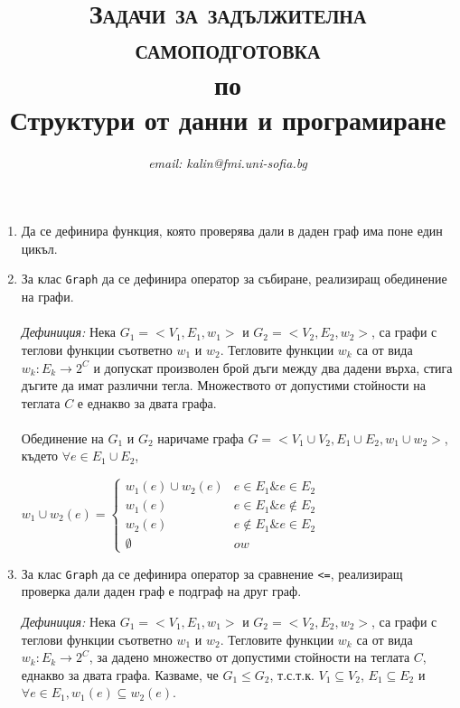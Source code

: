 \documentclass[12pt,a4paper]{article}
\author{\textit{email: kalin@fmi.uni-sofia.bg}}
\title{\textsc{Задачи за задължителна самоподготовка} \\
по \\
Структури от данни и програмиране}
\begin{document}
\maketitle


\begin{enumerate}

	\item Да се дефинира функция, която проверява дали в даден граф има поне един цикъл.

	\item За клас \texttt{Graph} да се дефинира оператор за събиране, реализиращ обединение на графи. 
	\\
	\\
	\textit{Дефиниция:} Нека $G_1=<V_1,E_1,w_1>$ и $G_2 = <V_2,E_2,w_2>$, са графи с теглови функции съответно $w_1$ и $w_2$. Тегловите функции $w_k$ са от вида $w_k:E_k \rightarrow 2^C$ и допускат произволен брой дъги между два дадени върха, стига дъгите да имат различни тегла. Множеството от допустими стойности на теглата $C$ е еднакво за двата графа. 
	\\
	\\
	Обединение на $G_1$ и $G_2$ наричаме графа $G=<V_1 \cup V_2,E_1 \cup E_2,w_1 \cup w_2>$, където $\forall e \in E_1 \cup E_2$, 

$w_1 \cup w_2 (e) = \begin{cases} 
				      w_1(e) \cup w_2(e) & e \in E_1 \& e \in E_2 \\
				      w_1(e) & e \in E_1 \& e \notin E_2  \\
				      w_2(e) & e \notin E_1 \& e \in E_2  \\ 
				      \emptyset & ow
				   \end{cases}$

	\item За клас \texttt{Graph} да се дефинира оператор за сравнение \texttt{<=}, реализиращ проверка дали даден граф е подграф на друг граф. 

	\textit{Дефиниция:} Нека $G_1=<V_1,E_1,w_1>$ и $G_2 = <V_2,E_2,w_2>$, са графи с теглови функции съответно $w_1$ и $w_2$. Тегловите функции $w_k$ са от вида $w_k:E_k \rightarrow 2^C$, за дадено множество от допустими стойности на теглата $C$, еднакво за двата графа. Казваме, че $G_1 \le G_2$, т.с.т.к. $V_1 \subseteq V_2$, $E_1 \subseteq E_2$ и $\forall e \in E_1, w_1(e) \subseteq w_2 (e)$.

\end{enumerate}
\end{document}
